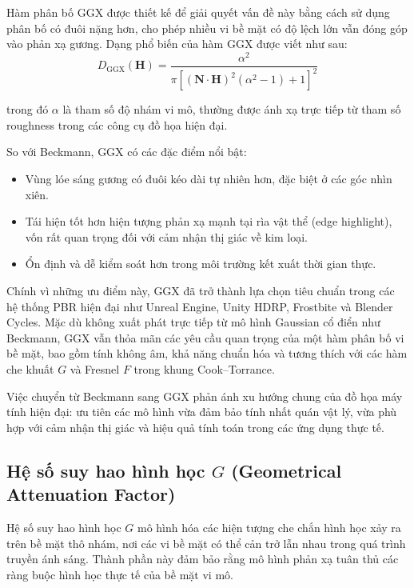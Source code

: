 Hàm phân bố GGX \cite{pbr_ggx_2007} được thiết kế để giải quyết vấn đề này bằng cách sử dụng phân bố có đuôi nặng hơn, cho phép nhiều vi bề mặt có độ lệch lớn vẫn đóng góp vào phản xạ gương. Dạng phổ biến của hàm GGX được viết như sau:
\begin{equation}
	D_{\text{GGX}}(\mathbf{H}) =
	\frac{\alpha^2}
	{\pi \left[ (\mathbf{N} \cdot \mathbf{H})^2 (\alpha^2 - 1) + 1 \right]^2}
\end{equation}

trong đó \(\alpha\) là tham số độ nhám vi mô, thường được ánh xạ trực tiếp từ tham số roughness trong các công cụ đồ họa hiện đại.

So với Beckmann, GGX có các đặc điểm nổi bật:
\begin{itemize}
	\item Vùng lóe sáng gương có đuôi kéo dài tự nhiên hơn, đặc biệt ở các góc nhìn xiên.
	\item Tái hiện tốt hơn hiện tượng phản xạ mạnh tại rìa vật thể (edge highlight), vốn rất quan trọng đối với cảm nhận thị giác về kim loại.
	\item Ổn định và dễ kiểm soát hơn trong môi trường kết xuất thời gian thực.
\end{itemize}

Chính vì những ưu điểm này, GGX đã trở thành lựa chọn tiêu chuẩn trong các hệ thống PBR hiện đại như Unreal Engine, Unity HDRP, Frostbite và Blender Cycles. Mặc dù không xuất phát trực tiếp từ mô hình Gaussian cổ điển như Beckmann, GGX vẫn thỏa mãn các yêu cầu quan trọng của một hàm phân bố vi bề mặt, bao gồm tính không âm, khả năng chuẩn hóa và tương thích với các hàm che khuất $G$ và Fresnel $F$ trong khung Cook--Torrance.

Việc chuyển từ Beckmann sang GGX phản ánh xu hướng chung của đồ họa máy tính hiện đại: ưu tiên các mô hình vừa đảm bảo tính nhất quán vật lý, vừa phù hợp với cảm nhận thị giác và hiệu quả tính toán trong các ứng dụng thực tế.

\subsection{Hệ số suy hao hình học $G$ (Geometrical Attenuation Factor)}

Hệ số suy hao hình học $G$ mô hình hóa các hiện tượng che chắn hình học xảy ra trên bề mặt thô nhám, nơi các vi bề mặt có thể cản trở lẫn nhau trong quá trình truyền ánh sáng. Thành phần này đảm bảo rằng mô hình phản xạ tuân thủ các ràng buộc hình học thực tế của bề mặt vi mô.

